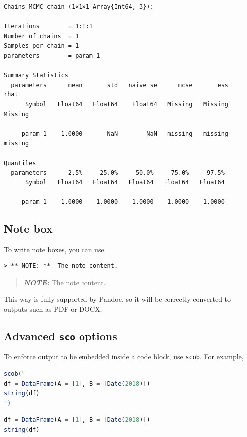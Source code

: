 \documentclass[
  notoc %
]{tufte-book}
\newcommand{\passthrough}[1]{#1}
\begin{document}
\begin{lstlisting}[language=Output]
Chains MCMC chain (1×1×1 Array{Int64, 3}):

Iterations        = 1:1:1
Number of chains  = 1
Samples per chain = 1
parameters        = param_1

Summary Statistics
  parameters      mean       std   naive_se      mcse       ess      rhat
      Symbol   Float64   Float64    Float64   Missing   Missing   Missing

     param_1    1.0000       NaN        NaN   missing   missing   missing

Quantiles
  parameters      2.5%     25.0%     50.0%     75.0%     97.5%
      Symbol   Float64   Float64   Float64   Float64   Float64

     param_1    1.0000    1.0000    1.0000    1.0000    1.0000

\end{lstlisting}

\hypertarget{note-box}{%
\subsection{Note box}\label{note-box}}

To write note boxes, you can use

\begin{lstlisting}
> **_NOTE:_**  The note content.
\end{lstlisting}

\begin{quote}
\textbf{\emph{NOTE:}} The note content.
\end{quote}

This way is fully supported by Pandoc, so it will be correctly converted
to outputs such as PDF or DOCX.

\hypertarget{advanced-sco-options}{%
\subsection{\texorpdfstring{Advanced \texttt{sco}
options}{Advanced sco options}}\label{advanced-sco-options}}

To enforce output to be embedded inside a code block, use
\passthrough{\lstinline!scob!}. For example,

\begin{lstlisting}[language=Julia]
scob("
df = DataFrame(A = [1], B = [Date(2018)])
string(df)
")
\end{lstlisting}

\begin{lstlisting}[language=Julia]
df = DataFrame(A = [1], B = [Date(2018)])
string(df)
\end{lstlisting}
\end{document}
